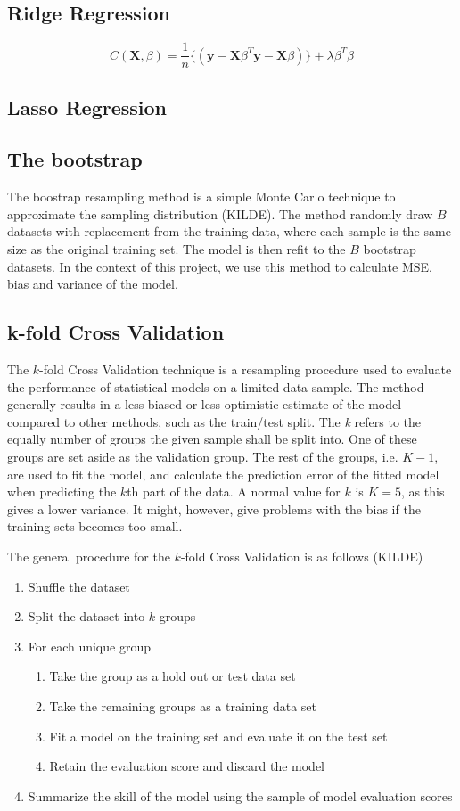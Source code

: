 \documentclass{article}
\begin{document}
\subsection{Ridge Regression}
\begin{equation}
C(\textbf{X},\beta) = \dfrac{1}{n} \{( \textbf{y}-\textbf{X}\beta^{T}\textbf{y}-\textbf{X}\beta)\} + \lambda \beta^{T} \beta 
\end{equation}
\subsection{Lasso Regression}
\subsection{The bootstrap}
The boostrap resampling method is a simple Monte Carlo technique to approximate the sampling distribution (KILDE). The method randomly draw $B$ datasets with replacement from the training data, where each sample is the same size as the original training set. The model is then refit to the $B$ bootstrap datasets. In the context of this project, we use this method to calculate MSE, bias and variance of the model.
\subsection{k-fold Cross Validation}
The $k$-fold Cross Validation technique is a resampling procedure used to evaluate the performance of statistical models on a limited data sample. The method generally results in a less biased or less optimistic estimate of the model compared to other methods, such as the train/test split. The \textit{k} refers to the equally number of groups the given sample shall be split into. One of these groups are set aside as the validation group. The rest of the groups, i.e. $K-1$, are used to fit the model, and calculate the prediction error of the fitted model when predicting the $k$th part of the data. A normal value for $k$ is $K=5$, as this gives a lower variance. It might, however, give problems with the bias if the training sets becomes too small.

The general procedure for the $k$-fold Cross Validation is as follows (KILDE)
\begin{enumerate}
\item Shuffle the dataset
\item Split the dataset into $k$ groups
\item For each unique group
\begin{enumerate}
\item Take the group as a hold out or test data set
\item Take the remaining groups as a training data set
\item Fit a model on the training set and evaluate it on the test set
\item Retain the evaluation score and discard the model
\end{enumerate}
	
\item Summarize the skill of the model using the sample of model evaluation scores
\end{enumerate}
\end{document}
